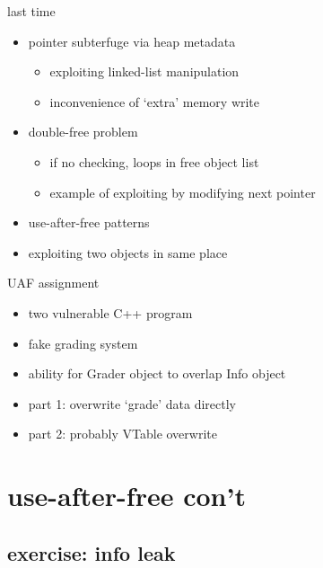 \date{}
\title{}
\usepackage[outputdir=latex.out]{minted}

\begin{frame}
    \titlepage
\end{frame}



\begin{frame}{last time}
    \begin{itemize}
    \item pointer subterfuge via heap metadata
        \begin{itemize}
        \item exploiting linked-list manipulation
        \item inconvenience of `extra' memory write
        \end{itemize}
    \item double-free problem
        \begin{itemize}
        \item if no checking, loops in free object list
        \item example of exploiting by modifying next pointer
        \end{itemize}
    \item use-after-free patterns
    \item exploiting two objects in same place
    \end{itemize}
\end{frame}

\begin{frame}{UAF assignment}
    \begin{itemize}
    \item two vulnerable C++ program
    \item fake grading system
    \item ability for Grader object to overlap Info object
    \item part 1: overwrite `grade' data directly
    \item part 2: probably VTable overwrite
    \end{itemize}
\end{frame}

\section{use-after-free con't}
\subsection{exercise: info leak}


